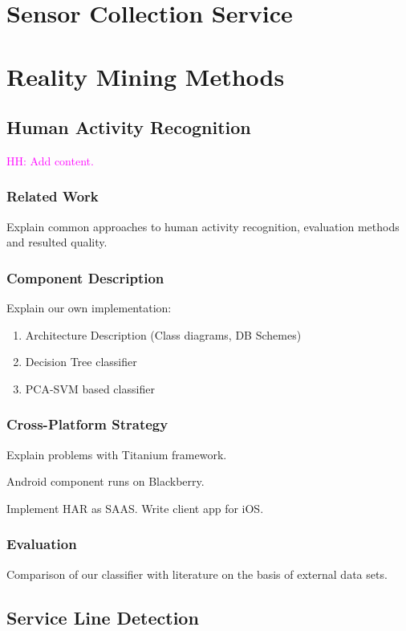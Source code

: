 \documentclass[external]{20120615_deliverable_template_ukob}
\theoremstyle{definition}
\newcommand{\todo}[2]{\textcolor{magenta}{#1: #2}}
\begin{document}
\clearpage
\chapter{Sensor Collection Service}


\chapter{Reality Mining Methods}

\section{Human Activity Recognition}
\todo{HH}{Add content.}

\subsection{Related Work}
Explain common approaches to human activity recognition, evaluation
methods and resulted quality.

\subsection{Component Description}
Explain our own implementation:

\begin{enumerate}
\item Architecture Description (Class diagrams, DB Schemes)
\item Decision Tree classifier
\item PCA-SVM based classifier
\end{enumerate}

\subsection{Cross-Platform Strategy}
Explain problems with Titanium framework.

Android component runs on Blackberry. 

Implement HAR as SAAS. Write client app for iOS.

\subsection{Evaluation}
Comparison of our classifier with literature on the basis of external
data sets.

\section{Service Line Detection}
\end{document}

